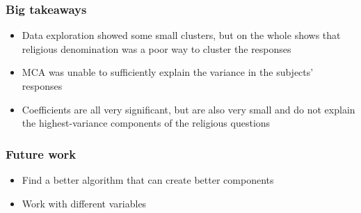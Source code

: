 \documentclass{beamer}
\begin{document}
\begin{frame}
	\frametitle{Big takeaways}
	\begin{itemize}
		\item Data exploration showed some small clusters, but on the whole shows that religious denomination was a poor way to cluster the responses 
		\item MCA was unable to sufficiently explain the variance in the subjects' responses
		\item Coefficients are all very significant, but are also very small and do not explain the highest-variance components of the religious questions
	\end{itemize}
\end{frame}

\begin{frame}
\frametitle{Future work}
	\begin{itemize}
		\item Find a better algorithm that can create better components
		\item Work with different variables
	\end{itemize}
\end{frame}

\end{document}
